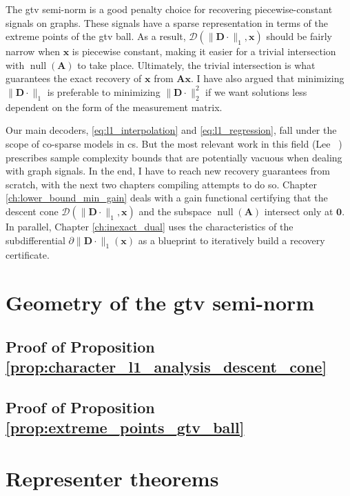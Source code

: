 The \acrshort{gtv} semi-norm is a good penalty choice for recovering piecewise-constant signals on graphs. These signals have a sparse representation in terms of the extreme points of the \acrshort{gtv} ball. As a result, $\mathcal{D}(\| \mathbf{D} \cdot \|_1, \mathbf{x})$ should be fairly narrow when $\mathbf{x}$ is piecewise constant, making it easier for a trivial intersection with $\operatorname{null} \left ( \mathbf{A} \right )$ to take place. Ultimately, the trivial intersection is what guarantees the exact recovery of $\mathbf{x}$ from $\mathbf{Ax}$. I have also argued that minimizing $\|\mathbf{D} \cdot\|_1$ is preferable to minimizing $\|\mathbf{D} \cdot\|_2^2$ if we want solutions less dependent on the form of the measurement matrix.

Our main decoders, \eqref{eq:l1_interpolation} and \eqref{eq:l1_regression}, fall under the scope of co-sparse models in \acrlong{cs}. But the most relevant work in this field (Lee \etal~\cite{lee2018}) prescribes sample complexity bounds that are potentially vacuous when dealing with graph signals. In the end, I have to reach new recovery guarantees from scratch, with the next two chapters compiling attempts to do so. Chapter \ref{ch:lower_bound_min_gain} deals with a gain functional certifying that the descent cone $\mathcal{D}(\| \mathbf{D} \cdot \|_1, \mathbf{x})$ and the subspace $\operatorname{null} \left ( \mathbf{A} \right )$ intersect only at $\mathbf{0}$. In parallel, Chapter \ref{ch:inexact_dual} uses the characteristics of the subdifferential $\partial \| \mathbf{D} \cdot \|_1(\mathbf{x})$ as a blueprint to iteratively build a recovery certificate.

\clearpage

\begin{subappendices}
    \section{Geometry of the \texorpdfstring{\acrshort{gtv}}{G-TV} semi-norm}

    \subsection{Proof of Proposition \ref{prop:character_l1_analysis_descent_cone}}\label{sec:proof_character_l1_analysis_descent_cone}
    

    \subsection{Proof of Proposition \ref{prop:extreme_points_gtv_ball}}\label{sec:proof_extreme_gtv}
    

    \section{Representer theorems}\label{sec:proof_representer}
    
\end{subappendices}